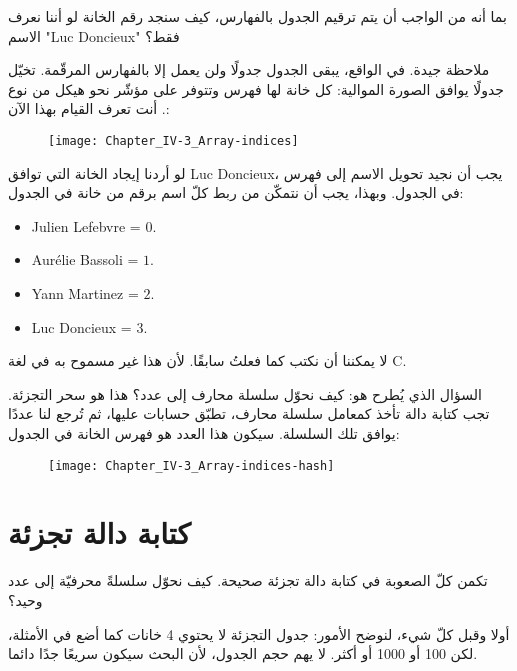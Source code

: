 \begin{question}
بما أنه من الواجب أن يتم ترقيم الجدول بالفهارس، كيف سنجد رقم الخانة لو أننا نعرف الاسم
"\textenglish{Luc Doncieux}"
 فقط؟
\end{question}

ملاحظة جيدة. في الواقع، يبقى الجدول جدولًا ولن يعمل إلا بالفهارس المرقّمة. تخيّل جدولًا يوافق الصورة الموالية: كل خانة لها فهرس وتتوفر على مؤشّر نحو هيكل من نوع
.
أنت تعرف القيام بهذا الآن:

\begin{figure}[H]
	\centering
	\texttt{[image: Chapter\_IV-3\_Array-indices]}
\end{figure}

 لو أردنا إيجاد الخانة التي توافق
\textenglish{Luc Doncieux}،
 يجب أن نجيد تحويل الاسم إلى فهرس في الجدول. وبهذا، يجب أن نتمكّن من ربط كلّ اسم برقم من خانة في الجدول:

\begin{itemize}
	\item \textenglish{Julien Lefebvre} = $0$.
	\item \textenglish{Aurélie Bassoli} = $1$.
	\item \textenglish{Yann Martinez} = $2$.
	\item \textenglish{Luc Doncieux} = $3$.
\end{itemize}

لا يمكننا أن نكتب
كما فعلتُ سابقًا. لأن هذا غير مسموح به في لغة
\textenglish{C}.

السؤال الذي يُطرح هو: كيف نحوّل سلسلة محارف إلى عدد؟ هذا هو سحر التجزئة. تجب كتابة دالة تأخذ كمعامل سلسلة محارف، تطبّق حسابات عليها، ثم تُرجع لنا عددًا يوافق تلك السلسلة. سيكون هذا العدد هو فهرس الخانة في الجدول:

\begin{figure}[H]
	\centering
	\texttt{[image: Chapter\_IV-3\_Array-indices-hash]}
\end{figure}

\section{كتابة دالة تجزئة}

تكمن كلّ الصعوبة في كتابة دالة تجزئة صحيحة. كيف نحوّل سلسلةً محرفيّة إلى عدد وحيد؟

أولا وقبل كلّ شيء، لنوضح الأمور: جدول التجزئة لا يحتوي 4 خانات كما أضع في الأمثلة، لكن 100 أو 1000 أو أكثر. لا يهم حجم الجدول، لأن البحث سيكون سريعًا جدًا دائما.

